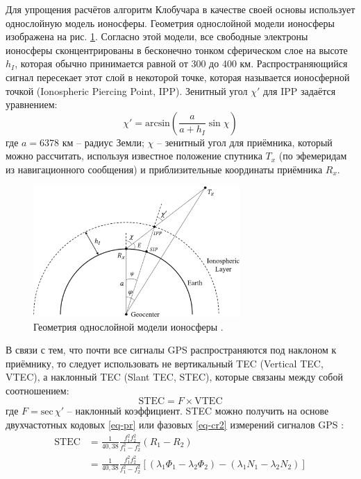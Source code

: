 Для упрощения расчётов алгоритм Клобучара в качестве своей основы использует однослойную модель ионосферы.
Геометрия однослойной модели ионосферы изображена на рис. \ref{fig-slm}.
Согласно этой модели, все свободные электроны ионосферы сконцентрированы в бесконечно тонком сферическом слое на высоте $h_I$, которая обычно принимается равной от 300 до 400 км. 
Распространяющийся сигнал пересекает этот слой в некоторой точке, которая называется ионосферной точкой (Ionospheric Piercing Point, IPP). 
Зенитный угол $\chi'$ для IPP задаётся уравнением:
\begin{equation}
\chi'=\text{arcsin}\left(\frac{a}{a+h_I}\sin\chi\right)    
\label{eq-zenith-angle}
\end{equation}
где 
$a=6378$ км -- радиус Земли;
$\chi$ -- зенитный угол для приёмника, который можно рассчитать, используя известное положение спутника $T_x$ (по эфемеридам из навигационного сообщения) и приблизительные координаты приёмника $R_x$.
\begin{figure}[h]
\centering    
\includegraphics[width=0.7\textwidth]{fig/slm.png}    
\caption{Геометрия однослойной модели ионосферы \cite{Hofmann2008}.}
\label{fig-slm}      
\end{figure}

В связи с тем, что почти все сигналы GPS распространяются под наклоном к приёмнику, то следует использовать не вертикальный TEC (Vertical TEC, VTEC), а наклонный TEC (Slant TEC, STEC), которые связаны между собой соотношением:
\begin{equation}
\text{STEC}=F\times\text{VTEC}
\label{eq-stec}
\end{equation}
где
$F=\text{sec}\,\chi'$ -- наклонный коэффициент.
STEC можно получить на основе двухчастотных кодовых \eqref{eq-pr} или фазовых \eqref{eq-cr2} измерений сигналов GPS \cite{Hofmann2008}:
\begin{equation}
\begin{aligned}
\text{STEC}&=\frac{1}{40,38}\frac{f_1^2f_2^2}{f_1^2-f_2^2}(R_1-R_2) \\
&=\frac{1}{40,38}\frac{f_1^2f_2^2}{f_1^2-f_2^2}\left[(\lambda_1\Phi_1-\lambda_2\Phi_2)-(\lambda_1N_1-\lambda_2N_2)\right] 
\end{aligned}
\end{equation}

